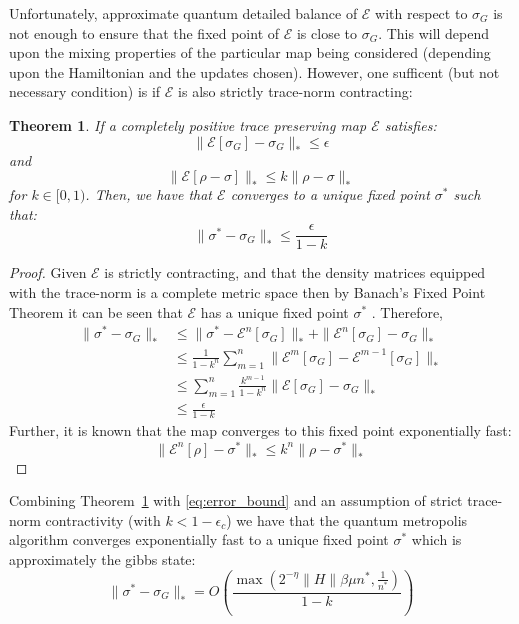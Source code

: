 \documentclass[aps,floatfix,10pt,amssymb,amsfont,amsmath,superscriptaddress,float,nofootinbib,longbibliography,nobalancelastpage,twocolumn]{revtex4-2}
\newtheorem{theorem}{Theorem}
\begin{document}
 Unfortunately, approximate quantum detailed balance of $\mathcal{E}$ with respect to $\sigma_G$ is not enough to ensure that the fixed point of $\mathcal{E}$ is close to $\sigma_G$. This will depend upon the mixing properties of the particular map being considered (depending upon the Hamiltonian and the updates chosen). However, one sufficent (but not necessary condition) is if $\mathcal{E}$ is also strictly trace-norm contracting:
 \begin{theorem}
     If a completely positive trace preserving map $\mathcal{E}$ satisfies:
     \begin{equation}
         \|\mathcal{E}[\sigma_G] - \sigma_G\|_* \leq \epsilon
     \end{equation}
     and
 \begin{equation}
     \|\mathcal{E}[\rho-\sigma]\|_* \leq k\|\rho-\sigma\|_*
 \end{equation}
 for $k \in [0,1)$. Then, we have that $\mathcal{E}$ converges to a unique fixed point $\sigma^*$ such that:
 \begin{equation}
     \| \sigma^* -\sigma_G\|_* \leq \frac{\epsilon}{1-k}
 \end{equation}
 \label{theorem:error_bound}
 \end{theorem}
 \begin{proof}
     Given $\mathcal{E}$ is strictly contracting, and that the density matrices equipped with the trace-norm is a complete metric space then by Banach’s Fixed Point Theorem it can be seen that $\mathcal{E}$ has a unique fixed point $\sigma^*$ \cite{Mart_nez_Pe_a_2023,Raginsky_2002}.
Therefore,
\begin{align}
 \| \sigma^* -\sigma_G\|_* &\leq \|\sigma^*-\mathcal{E}^n[\sigma_G]\|_* +\|\mathcal{E}^n[\sigma_G] - \sigma_G\|_*\\
     &\leq \frac{1}{1-k^n}\sum_{m=1}^n \| \mathcal{E}^m[\sigma_G] - \mathcal{E}^{m-1}[\sigma_G]\|_*\\
    & \leq \sum_{m=1}^n\frac{k^{m-1}}{1-k^n} \| \mathcal{E}[\sigma_G] - \sigma_G\|_*\\
    &\leq \frac{\epsilon}{1-k}
\end{align}
Further, it is known that the map converges to this fixed point exponentially fast:
\begin{equation}
     \|\mathcal{E}^n[\rho] -\sigma^*\|_* \leq k^n\| \rho - \sigma^*\|_*
\end{equation}
 \end{proof}

Combining Theorem~\ref{theorem:error_bound} with \eqref{eq:error_bound} and an assumption of strict trace-norm contractivity (with $k < 1-\epsilon_c$) we have that the quantum metropolis algorithm converges exponentially fast to a unique fixed point $\sigma^*$ which is approximately the gibbs state:
\begin{equation}
    \|\sigma^*-\sigma_G\|_* = 
    O\left(\frac{\max\left( 2^{-\eta}\|H\|\beta\mu  n^*,\frac{1}{n^*}\right)}{1-k}\right)
\end{equation}
\end{document}
